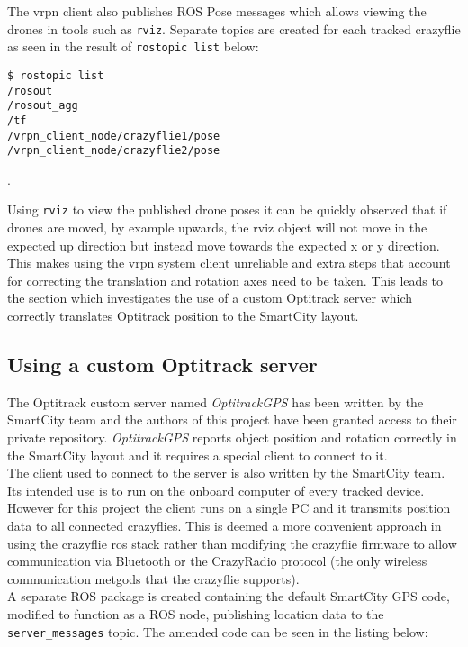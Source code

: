 \noindent The vrpn client also publishes ROS Pose messages which allows viewing the drones in tools such as \texttt{rviz}. Separate topics are created for each tracked crazyflie as seen in the result of \texttt{rostopic list} below:
\begin{mdframed}[backgroundcolor=light-gray, linecolor=light-gray]
\begin{verbatim}
$ rostopic list
/rosout
/rosout_agg
/tf
/vrpn_client_node/crazyflie1/pose
/vrpn_client_node/crazyflie2/pose
\end{verbatim}
\end{mdframed}.

\noindent Using \texttt{rviz} to view the published drone poses it can be quickly observed that if drones are moved, by example upwards, the rviz object will not move in the expected up direction but instead move towards the expected x or y direction. This makes using the vrpn system client unreliable and extra steps that account for correcting the translation and rotation axes need to be taken. This leads to the section which investigates the use of a custom Optitrack server which correctly translates Optitrack position to the SmartCity layout.


\subsection{Using a custom Optitrack server}
The Optitrack custom server named \textit{OptitrackGPS} has been written by the SmartCity team and the authors of this project have been granted access to their private repository. \textit{OptitrackGPS} reports object position and rotation correctly in the SmartCity layout and it requires a special client to connect to it.\\

\noindent The client used to connect to the server is also written by the SmartCity team. Its intended use is to run on the onboard computer of every tracked device. However for this project the client runs on a single PC and it transmits position data to all connected crazyflies. This is deemed a more convenient approach in using the crazyflie ros stack rather than modifying the crazyflie firmware to allow communication via Bluetooth or the CrazyRadio protocol (the only wireless communication metgods that the crazyflie supports).\\

\noindent A separate ROS package is created containing the default SmartCity GPS code, modified to function as a ROS node, publishing location data to the \texttt{server\_messages} topic. The amended code can be seen in the listing below:

